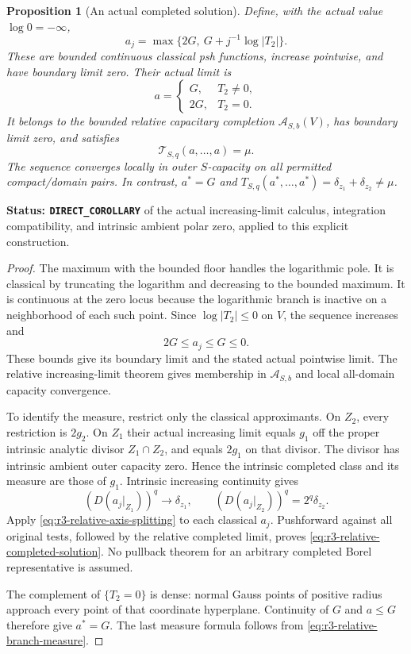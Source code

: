 \documentclass[11pt,a4paper]{article}
\numberwithin{equation}{section}
\newtheorem{proposition}[theorem]{Proposition}
\theoremstyle{definition}
\theoremstyle{remark}
\begin{document}
\begin{proposition}[An actual completed solution]
\label{prop:r3-relative-completed-dirichlet-example}
Define, with the actual value $\log0=-\infty$,
\[
 a_j=\max\{2G,\ G+j^{-1}\log|T_2|\}.
\]
These are bounded continuous classical psh functions, increase
pointwise, and have boundary limit zero. Their actual limit is
\[
 a=
 \begin{cases}
 G,&T_2\ne0,\\
 2G,&T_2=0.
 \end{cases}
\]
It belongs to the bounded relative capacitary completion
$\mathcal A_{S,b}(V)$, has boundary limit zero, and satisfies
\begin{equation}
 \mathcal T_{S,q}(a,\ldots,a)=\mu.
 \label{eq:r3-relative-completed-solution}
\end{equation}
The sequence converges locally in outer $S$-capacity on all
permitted compact/domain pairs. In contrast, $a^*=G$ and
$T_{S,q}(a^*,\ldots,a^*)=\delta_{z_1}+\delta_{z_2}\ne\mu$.
\end{proposition}

\noindent\textbf{Status: \texttt{DIRECT\_COROLLARY}} of the actual
increasing-limit calculus, integration compatibility, and intrinsic
ambient polar zero, applied to this explicit construction.

\begin{proof}
The maximum with the bounded floor handles the logarithmic pole.
It is classical by truncating the logarithm and decreasing to the
bounded maximum. It is continuous at the zero locus because
the logarithmic branch is inactive on a neighborhood of each such
point. Since $\log|T_2|\leq0$ on $V$, the sequence increases and
\[
 2G\leq a_j\leq G\leq0.
\]
These bounds give its boundary limit and the stated actual
pointwise limit. The relative increasing-limit theorem gives
membership in $\mathcal A_{S,b}$ and local all-domain capacity
convergence.

To identify the measure, restrict only the classical approximants.
On $Z_2$, every restriction is $2g_2$. On $Z_1$ their actual
increasing limit equals $g_1$ off the proper intrinsic analytic
divisor $Z_1\cap Z_2$, and equals $2g_1$ on that divisor.
The divisor has intrinsic ambient outer capacity zero. Hence the
intrinsic completed class and its measure are those of $g_1$.
Intrinsic increasing continuity gives
\[
 (D(a_j|_{Z_1}))^q\longrightarrow\delta_{z_1},\qquad
 (D(a_j|_{Z_2}))^q=2^q\delta_{z_2}.
\]
Apply \eqref{eq:r3-relative-axis-splitting} to each classical $a_j$.
Pushforward against all original tests, followed by the relative
completed limit, proves
\eqref{eq:r3-relative-completed-solution}. No pullback theorem for
an arbitrary completed Borel representative is assumed.

The complement of $\{T_2=0\}$ is dense: normal Gauss points of
positive radius approach every point of that coordinate
hyperplane. Continuity of $G$ and $a\leq G$ therefore give
$a^*=G$. The last measure formula follows from
\eqref{eq:r3-relative-branch-measure}.
\end{proof}
\end{document}

